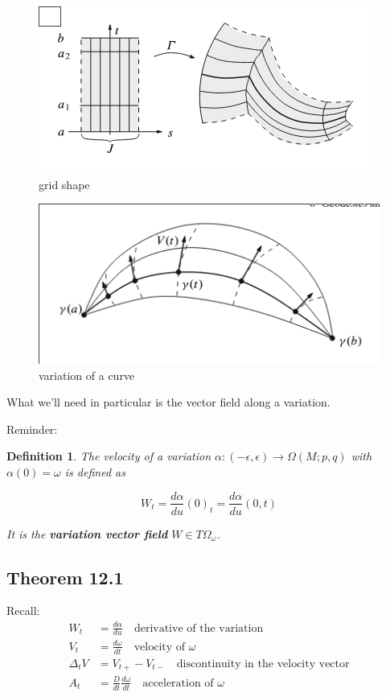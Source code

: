 \documentclass{article}
\newtheorem{def}{Definition}
\begin{document}
\begin{figure}
    \includegraphics{img/grid.png}
    \caption{grid shape}
    \label{fig:grid}
\end{figure}
\begin{figure}
    \includegraphics{img/sail.png}
    \caption{variation of a curve}
    \label{fig:sail}
\end{figure}



What we'll need in particular is the vector field along a variation.

Reminder:

\begin{def}
\label{def:vel_of_var}
    The velocity of a variation $\alpha: (-\epsilon, \epsilon) \rightarrow \Omega(M;p,q)$ with
    $\alpha(0) = \omega$ is defined as

    \[ W_t = \frac{d\alpha}{du}(0)_t = \frac{d\alpha}{du}(0, t) \]

    It is the \textbf{variation vector field} $W \in T\Omega_{\omega}$.
\end{def}
\subsection{Theorem 12.1}


Recall:
\[
    \begin{align*}
        W_t &= \frac{d\alpha}{du} \quad\text{derivative of the variation} \\
        V_t &= \frac{d\omega}{dt} \quad\text{velocity of $\omega$} \\
        \Delta_tV &= V_{t+} - V_{t-} \quad\text{discontinuity in the velocity vector} \\
        A_t &= \frac{D}{dt} \frac{d\omega}{dt} \quad\text{acceleration of $\omega$} \\
    \end{align*}
\]
\end{document}
